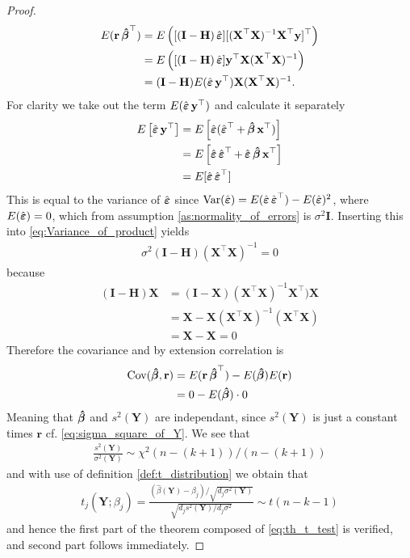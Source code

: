 \begin{proof}
\begin{align} \label{eq:Variance_of_product}
    E(\textbf{r} \operatorname{\boldsymbol{\hat{\beta}}}^\top) &= E \left( [(\textbf{I} - \textbf{H}) \operatorname{\hat{\boldsymbol{\varepsilon}}}] [(\textbf{X}^\top \textbf{X})^{-1} \textbf{X}^\top \textbf{y}]^\top \right) \\
    &= E \left( [(\textbf{I}-\textbf{H}) \operatorname{\hat{\boldsymbol{\varepsilon}}}] \textbf{y}^\top \textbf{X} (\textbf{X}^\top \textbf{X})^{-1} \right) \nonumber \\
    &= (\textbf{I}-\textbf{H}) E(\operatorname{\hat{\boldsymbol{\varepsilon}}} \textbf{y}^\top ) \textbf{X}(\textbf{X}^\top \textbf{X})^{-1}. \nonumber
\end{align}
For clarity we take out the term $E(\operatorname{\hat{\boldsymbol{\varepsilon}}} \textbf{y}^\top )$ and calculate it separately
\begin{align*}
    E \left[ \operatorname{\hat{\boldsymbol{\varepsilon}}} \textbf{y}^\top \right] &= E \left[ \operatorname{\hat{\boldsymbol{\varepsilon}}} (\operatorname{\hat{\boldsymbol{\varepsilon}}}^\top + \operatorname{\boldsymbol{\hat{\beta}}} \textbf{x}^\top) \right] \\
    &= E \left[ \operatorname{\hat{\boldsymbol{\varepsilon}}} \operatorname{\hat{\boldsymbol{\varepsilon}}}^\top + \operatorname{\hat{\boldsymbol{\varepsilon}}} \operatorname{\boldsymbol{\hat{\beta}}} \textbf{x}^\top \right] \\
    &= E[\operatorname{\hat{\boldsymbol{\varepsilon}}} \operatorname{\hat{\boldsymbol{\varepsilon}}}^\top]
\end{align*}
This is equal to the variance of $\operatorname{\hat{\boldsymbol{\varepsilon}}}$ since $\operatorname{\text{Var}}(\operatorname{\hat{\boldsymbol{\varepsilon}}}) = E(\operatorname{\hat{\boldsymbol{\varepsilon}}} \operatorname{\hat{\boldsymbol{\varepsilon}}}^\top) - E(\operatorname{\hat{\boldsymbol{\varepsilon}}})^2$, where $E(\operatorname{\hat{\boldsymbol{\varepsilon}}})=0$, which from assumption \ref{as:normality_of_errors} is $\sigma^2 \textbf{I}$.
Inserting this into \eqref{eq:Variance_of_product} yields
\begin{align*}
    \sigma^2 (\textbf{I}-\textbf{H})  (\textbf{X}^\top \textbf{X})^{-1} = 0
\end{align*}
because
\begin{align*}
    (\textbf{I}-\textbf{H})\textbf{X} &= (\textbf{I}-\textbf{X})(\textbf{X}^\top \textbf{X})^{-1}\textbf{X}^\top)\textbf{X} \\
    &= \textbf{X} - \textbf{X} (\textbf{X}^\top \textbf{X})^{-1} (\textbf{X}^\top \textbf{X}) \\
    &= \textbf{X} - \textbf{X} = 0
\end{align*}
Therefore the covariance and by extension correlation is
\begin{align*}
    \operatorname{\text{Cov}} (\operatorname{\boldsymbol{\hat{\beta}}}, \textbf{r}) &= E(\textbf{r} \operatorname{\boldsymbol{\hat{\beta}}}^\top) - E(\operatorname{\boldsymbol{\hat{\beta}}}) E(\textbf{r}) \\
    &= 0 - E(\operatorname{\boldsymbol{\hat{\beta}}}) \cdot 0
\end{align*}
Meaning that $\operatorname{\boldsymbol{\hat{\beta}}}$ and $s^2(\textbf{Y})$ are independant, since $s^2(\textbf{Y})$ is just a constant times $\textbf{r}$ cf. \eqref{eq:sigma_square_of_Y}.
We see that
\begin{align*}
    \frac{s^2(\textbf{Y})}{\sigma^2(\textbf{Y})} \sim \chi^2(n-(k+1))/(n-(k+1))
\end{align*}
and with use of definition \ref{def:t_distribution} we obtain that
\begin{align*}
    t_j(\textbf{Y};\beta_j)=\frac{(\hat{\beta}(\textbf{Y})-\beta_j)/\sqrt{d_j\sigma^2(\textbf{Y})}}{\sqrt{d_js^2(\textbf{Y})/d_j\sigma^2}} \sim t(n-k-1)
\end{align*}
and hence the first part of the theorem composed of \eqref{eq:th_t_test} is verified, and second part follows immediately. 
\end{proof}

